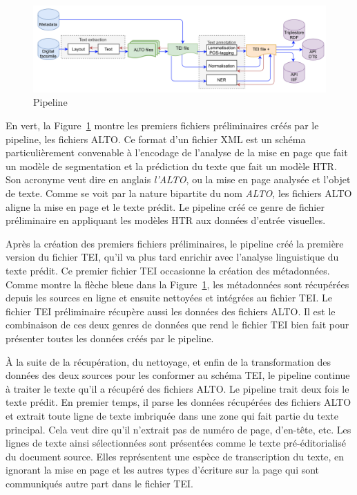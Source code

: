 \documentclass[class=article, crop=false]{standalone}
\begin{document}
\begin{figure}[hbt!]
\includegraphics[width=\textwidth]{../../../images/pipeline.png}
\caption{Pipeline}
\label{fig:pipeline}
\end{figure}

En vert, la Figure~\ref{fig:pipeline} montre les premiers fichiers préliminaires créés par le pipeline, les fichiers \acrshort{ALTO}. Ce format d'un fichier \acrshort{XML} est un schéma particulièrement convenable à l'encodage de l'analyse de la mise en page que fait un modèle de segmentation et la prédiction du texte que fait un modèle \acrshort{HTR}. Son acronyme veut dire en anglais \textit{l'\acrlong{ALTO}}, ou la mise en page analysée et l'objet de texte. Comme se voit par la nature bipartite du nom \textit{\acrlong{ALTO}}, les fichiers \acrshort{ALTO} aligne la mise en page et le texte prédit. Le pipeline créé ce genre de fichier préliminaire en appliquant les modèles \acrshort{HTR} aux données d'entrée visuelles.

Après la création des premiers fichiers préliminaires, le pipeline créé la première version du fichier \acrshort{TEI}, qu'il va plus tard enrichir avec l'analyse linguistique du texte prédit. Ce premier fichier \acrshort{TEI} occasionne la création des métadonnées. Comme montre la flèche bleue dans la Figure~\ref{fig:pipeline}, les métadonnées sont récupérées depuis les sources en ligne et ensuite nettoyées et intégrées au fichier \acrshort{TEI}. Le fichier \acrshort{TEI} préliminaire récupère aussi les données des fichiers \acrshort{ALTO}. Il est le combinaison de ces deux genres de données que rend le fichier \acrshort{TEI} bien fait pour présenter toutes les données créés par le pipeline.

À la suite de la récupération, du nettoyage, et enfin de la transformation des données des deux sources pour les conformer au schéma \acrshort{TEI}, le pipeline continue à traiter le texte qu'il a récupéré des fichiers \acrshort{ALTO}. Le pipeline trait deux fois le texte prédit. En premier temps, il parse les données récupérées des fichiers \acrshort{ALTO} et extrait toute ligne de texte imbriquée dans une zone qui fait partie du texte principal. Cela veut dire qu'il n'extrait pas de numéro de page, d'en-tête, etc. Les lignes de texte ainsi sélectionnées sont présentées comme le texte pré-éditorialisé du document source. Elles représentent une espèce de transcription du texte, en ignorant la mise en page et les autres types d'écriture sur la page qui sont communiqués autre part dans le fichier \acrshort{TEI}.
\end{document}
